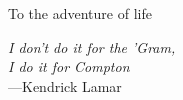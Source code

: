 %
\begin{frontmatter}

%
%

\makefrontmatter

%
%
%
%
%
%
\begin{dedication}
  To the adventure of life
\end{dedication}


%
%



%
%
\begin{epigraph} %
  \emph{I don't do it for the 'Gram,\\
	 I do it for Compton}\\
  ---Kendrick Lamar
\end{epigraph}

%



\end{frontmatter}
